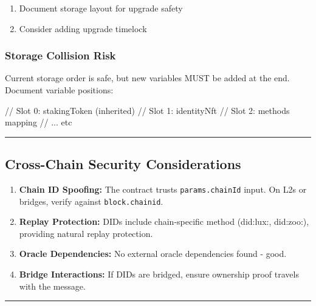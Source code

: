 \documentclass[
]{article}
\newenvironment{Shaded}{}{}
\newcommand{\NormalTok}[1]{#1}
\providecommand{\tightlist}{%
  \setlength{\itemsep}{0pt}\setlength{\parskip}{0pt}}
\begin{document}
\begin{enumerate}
\def\labelenumi{\arabic{enumi}.}
\setcounter{enumi}{1}
\tightlist
\item
  Document storage layout for upgrade safety
\item
  Consider adding upgrade timelock
\end{enumerate}

\subsubsection{Storage Collision Risk}\label{storage-collision-risk}

Current storage order is safe, but new variables MUST be added at the
end. Document variable positions:

\begin{Shaded}
\begin{Highlighting}[]
\NormalTok{// Slot 0: stakingToken (inherited)}
\NormalTok{// Slot 1: identityNft}
\NormalTok{// Slot 2: methods mapping}
\NormalTok{// ... etc}
\end{Highlighting}
\end{Shaded}

\begin{center}\rule{0.5\linewidth}{0.5pt}\end{center}

\subsection{Cross-Chain Security
Considerations}\label{cross-chain-security-considerations}

\begin{enumerate}
\def\labelenumi{\arabic{enumi}.}
\item
  \textbf{Chain ID Spoofing:} The contract trusts
  \texttt{params.chainId} input. On L2s or bridges, verify against
  \texttt{block.chainid}.
\item
  \textbf{Replay Protection:} DIDs include chain-specific method
  (did:lux:, did:zoo:), providing natural replay protection.
\item
  \textbf{Oracle Dependencies:} No external oracle dependencies found -
  good.
\item
  \textbf{Bridge Interactions:} If DIDs are bridged, ensure ownership
  proof travels with the message.
\end{enumerate}

\begin{center}\rule{0.5\linewidth}{0.5pt}\end{center}
\end{document}
